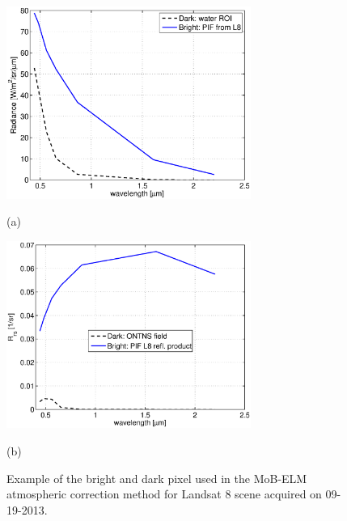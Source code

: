 \documentclass[onecolumn,3p,letterpaper,11pt]{elsarticle} %
\providecommand{\DIFaddbeginFL}{} %
\providecommand{\DIFaddendFL}{} %
\providecommand{\DIFdelbeginFL}{} %
\providecommand{\DIFdelendFL}{} %
\begin{document}
\begin{figure}[htb]
  \begin{minipage}[c]{0.48\linewidth}
    \centering
      \DIFdelbeginFL %
\DIFdelendFL \DIFaddbeginFL \includegraphics[width=8cm]{./Images/ELMrad130929_150422.eps}
    \DIFaddendFL %
    \centerline{(a)}\medskip
  \end{minipage}
  \hfill
  \begin{minipage}[d]{0.48\linewidth}
    \centering
      \DIFdelbeginFL %
\DIFdelendFL \DIFaddbeginFL \includegraphics[width=8cm]{./Images/ELMRrs130929_150422.eps}
    \DIFaddendFL %
    \centerline{(b)}\medskip
  \end{minipage}
  \caption{Example of the bright and dark pixel used in the MoB-ELM atmospheric correction method for Landsat 8 scene acquired on 09-19-2013.\label{fig:MOBELMpxls} } 
\end{figure}
\end{document}
